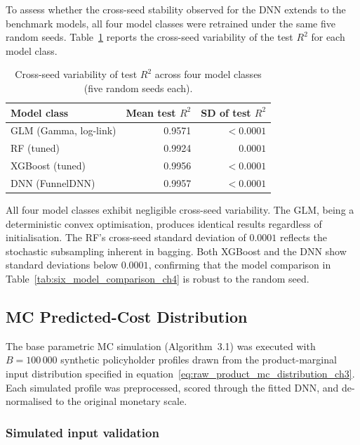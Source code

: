 To assess whether the cross-seed stability observed for the DNN
extends to the benchmark models, all four model classes were retrained
under the same five random seeds.
Table~\ref{tab:multiseed_all_models_ch4} reports the cross-seed
variability of the test $R^2$ for each model class.

\begin{table}[H]
\centering
\small
\renewcommand{\arraystretch}{1.15}
\begin{tabular}{lrr}
\toprule
\textbf{Model class} & \textbf{Mean test $R^2$} &
\textbf{SD of test $R^2$} \\
\midrule
GLM (Gamma, log-link) & 0.9571 & $< 0.0001$ \\
RF (tuned) & 0.9924 & $0.0001$ \\
XGBoost (tuned) & 0.9956 & $< 0.0001$ \\
DNN (FunnelDNN) & 0.9957 & $< 0.0001$ \\
\bottomrule
\end{tabular}
\caption{Cross-seed variability of test $R^2$ across four model
classes (five random seeds each).}
\label{tab:multiseed_all_models_ch4}
\end{table}

\noindent
All four model classes exhibit negligible cross-seed variability.  The
GLM, being a deterministic convex optimisation, produces identical
results regardless of initialisation.  The RF's cross-seed
standard deviation of $0.0001$ reflects the stochastic subsampling
inherent in bagging.  Both XGBoost and the DNN show
standard deviations below $0.0001$, confirming that the model comparison
in Table~\ref{tab:six_model_comparison_ch4} is robust to the random
seed.


\subsection{MC Predicted-Cost Distribution}
\label{sec:mc_results}

The base parametric MC simulation (Algorithm~3.1) was executed
with $B = 100\,000$ synthetic policyholder profiles drawn from the
product-marginal input distribution specified in
equation~\eqref{eq:raw_product_mc_distribution_ch3}. Each simulated
profile was preprocessed, scored through the fitted DNN, and
de-normalised to the original monetary scale.

\subsubsection{Simulated input validation}
\label{sec:simulated_input_validation_ch4}

